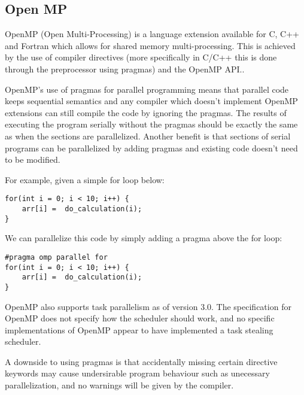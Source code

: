 \subsection{Open MP}

OpenMP (Open Multi-Processing) is a language extension available for C, C++ and Fortran which allows for shared memory multi-processing. 
This is achieved by the use of compiler directives (more specifically in C/C++ this is done through the preprocessor using pragmas) and
the OpenMP API.\cite{openmp}.

OpenMP's use of pragmas for parallel programming means that parallel code keeps sequential semantics
and any compiler which doesn't implement OpenMP extensions can still compile the code by ignoring the pragmas.
The results of executing the program serially without the pragmas should be exactly the same as when
the sections are parallelized. Another benefit is that sections of serial programs can be
parallelized by adding pragmas and existing code doesn't need to be modified.

For example, given a simple for loop below:

\begin{lstlisting}[style=myGPC]
for(int i = 0; i < 10; i++) {
    arr[i] =  do_calculation(i);
}
\end{lstlisting}

We can parallelize this code by simply adding a pragma above
the for loop:

\begin{lstlisting}[style=myGPC] 
#pragma omp parallel for
for(int i = 0; i < 10; i++) {
    arr[i] =  do_calculation(i);
}
\end{lstlisting}

OpenMP also supports task parallelism as of version 3.0\cite{openmp3}. The specification for OpenMP
does not specify how the scheduler should work, and no specific implementations of OpenMP appear to have 
implemented a task stealing scheduler.

A downside to using pragmas is that accidentally missing certain directive keywords may cause undersirable 
program behaviour such as unecessary parallelization\cite{openmptraps}, and no warnings will be given by the compiler.

 
